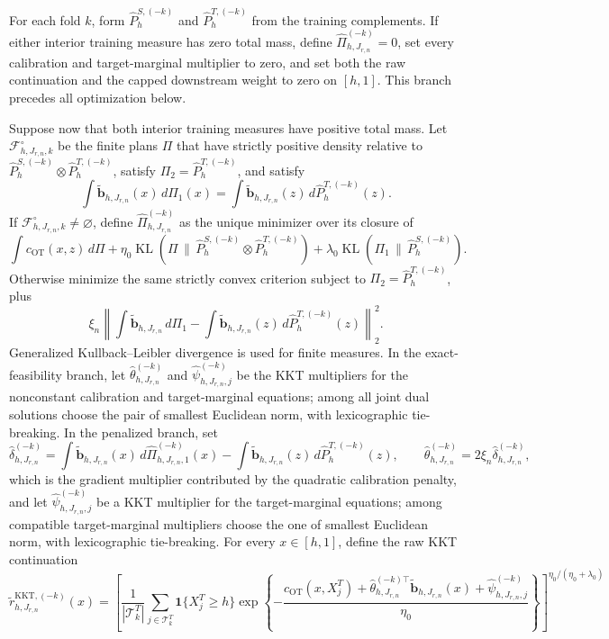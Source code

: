 For each fold \(k\), form \(\widehat P^{S,(-k)}_h\) and \(\widehat P^{T,(-k)}_h\) from the training complements. If either interior training measure has zero total mass, define \(\widehat\Pi^{(-k)}_{h,J_{r,n}}=0\), set every calibration and target-marginal multiplier to zero, and set both the raw continuation and the capped downstream weight to zero on \([h,1]\). This branch precedes all optimization below.

Suppose now that both interior training measures have positive total mass. Let \(\mathcal F^\circ_{h,J_{r,n},k}\) be the finite plans \(\Pi\) that have strictly positive density relative to \(\widehat P^{S,(-k)}_h\otimes\widehat P^{T,(-k)}_h\), satisfy \(\Pi_2=\widehat P^{T,(-k)}_h\), and satisfy
\[
\int\widetilde{\mathbf b}_{h,J_{r,n}}(x)\,d\Pi_1(x)=\int\widetilde{\mathbf b}_{h,J_{r,n}}(z)\,d\widehat P^{T,(-k)}_h(z).
\]
If \(\mathcal F^\circ_{h,J_{r,n},k}\ne\varnothing\), define \(\widehat\Pi^{(-k)}_{h,J_{r,n}}\) as the unique minimizer over its closure of
\[
\int c_{\mathrm{OT}}(x,z)\,d\Pi+\eta_0\operatorname{KL}(\Pi\,\|\,\widehat P^{S,(-k)}_h\otimes\widehat P^{T,(-k)}_h)+\lambda_0\operatorname{KL}(\Pi_1\,\|\,\widehat P^{S,(-k)}_h).
\]
Otherwise minimize the same strictly convex criterion subject to \(\Pi_2=\widehat P^{T,(-k)}_h\), plus
\[
\xi_n\left\|\int\widetilde{\mathbf b}_{h,J_{r,n}}\,d\Pi_1-\int\widetilde{\mathbf b}_{h,J_{r,n}}(z)\,d\widehat P^{T,(-k)}_h(z)\right\|_2^2.
\]
Generalized Kullback--Leibler divergence is used for finite measures. In the exact-feasibility branch, let \(\widehat\theta^{(-k)}_{h,J_{r,n}}\) and \(\widehat\psi^{(-k)}_{h,J_{r,n},j}\) be the KKT multipliers for the nonconstant calibration and target-marginal equations; among all joint dual solutions choose the pair of smallest Euclidean norm, with lexicographic tie-breaking. In the penalized branch, set
\[
\widehat\delta^{(-k)}_{h,J_{r,n}}=
\int\widetilde{\mathbf b}_{h,J_{r,n}}(x)\,d\widehat\Pi^{(-k)}_{h,J_{r,n},1}(x)
-\int\widetilde{\mathbf b}_{h,J_{r,n}}(z)\,d\widehat P^{T,(-k)}_h(z),
\qquad
\widehat\theta^{(-k)}_{h,J_{r,n}}=2\xi_n\widehat\delta^{(-k)}_{h,J_{r,n}},
\]
which is the gradient multiplier contributed by the quadratic calibration penalty, and let \(\widehat\psi^{(-k)}_{h,J_{r,n},j}\) be a KKT multiplier for the target-marginal equations; among compatible target-marginal multipliers choose the one of smallest Euclidean norm, with lexicographic tie-breaking. For every \(x\in[h,1]\), define the raw KKT continuation
\[
\widetilde r^{\mathrm{KKT},(-k)}_{h,J_{r,n}}(x)=
\left[\frac1{|\mathcal T^T_k|}\sum_{j\in\mathcal T^T_k}\mathbf 1\{X_j^T\ge h\}\exp\left\{-\frac{c_{\mathrm{OT}}(x,X_j^T)+\widehat\theta_{h,J_{r,n}}^{(-k)\top}\widetilde{\mathbf b}_{h,J_{r,n}}(x)+\widehat\psi^{(-k)}_{h,J_{r,n},j}}{\eta_0}\right\}\right]^{\eta_0/(\eta_0+\lambda_0)}
\]
